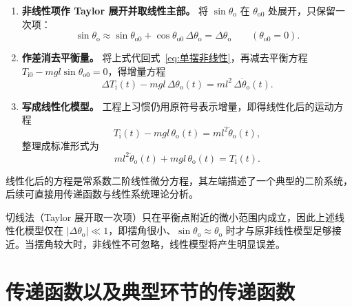 \begin{longexample}[单摆模型的线性化]
\begin{solution}
\begin{enumerate}
\item \textbf{非线性项作 Taylor 展开并取线性主部。} 将 $\sin\theta_{\mathrm{o}}$ 在 $\theta_{\mathrm{o}0}$ 处展开，只保留一次项：
\[
\sin\theta_{\mathrm{o}}\approx \sin\theta_{\mathrm{o}0}+\cos\theta_{\mathrm{o}0}\,\Delta\theta_{\mathrm{o}}
=\Delta\theta_{\mathrm{o}}\qquad(\theta_{\mathrm{o}0}=0).
\]

\item \textbf{作差消去平衡量。} 将上式代回式~\eqref{eq:单摆非线性}，再减去平衡方程 $T_{\mathrm{i}0}-mgl\sin\theta_{\mathrm{o}0}=0$，得增量方程
\[
\Delta T_{\mathrm{i}}(t)-m g l\,\Delta\theta_{\mathrm{o}}(t)=m l^{2}\,\Delta\ddot{\theta}_{\mathrm{o}}(t).
\]

\item \textbf{写成线性化模型。} 工程上习惯仍用原符号表示增量，即得线性化后的运动方程
\[
T_{\mathrm{i}}(t)-m g l\,\theta_{\mathrm{o}}(t)=m l^{2}\ddot{\theta}_{\mathrm{o}}(t),
\]
整理成标准形式为
\[
m l^{2}\ddot{\theta}_{\mathrm{o}}(t)+m g l\,\theta_{\mathrm{o}}(t)=T_{\mathrm{i}}(t).
\]
\end{enumerate}
线性化后的方程是常系数二阶线性微分方程，其左端描述了一个典型的二阶系统，后续可直接用传递函数与线性系统理论分析。
\end{solution}
\end{longexample}

\begin{remark}
切线法（Taylor 展开取一次项）只在平衡点附近的微小范围内成立，因此上述线性化模型仅在 $|\Delta\theta_{\mathrm{o}}|\ll 1$，即摆角很小、$\sin\theta_{\mathrm{o}}\approx\theta_{\mathrm{o}}$ 时才与原非线性模型足够接近。当摆角较大时，非线性不可忽略，线性模型将产生明显误差。
\end{remark}
\section{传递函数以及典型环节的传递函数}
